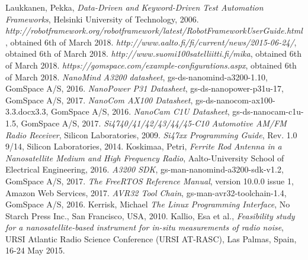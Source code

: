 \documentclass[english,12pt,a4paper,pdftex,elec,utf8]{aaltothesis}
\begin{document}
\begin{thebibliography}{99}
 Laukkanen, Pekka,
  \textit{Data-Driven and Keyword-Driven Test Automation Frameworks}, Helsinki University of Technology, 2006.
  \textit{http://robotframework.org/robotframework/latest/RobotFrameworkUserGuide.html}, obtained 6th of March 2018.  
  \textit{http://www.aalto.fi/fi/current/news/2015-06-24/}, obtained 6th of March 2018.
  \textit{http://www.suomi100satelliitti.fi/mika}, obtained 6th of March 2018.
  \textit{https://gomspace.com/example-configurations.aspx}, obtained 6th of March 2018.
  \textit{NanoMind A3200 datasheet}, gs-ds-nanomind-a3200-1.10, GomSpace A/S, 2016.
  \textit{NanoPower P31 Datasheet}, gs-ds-nanopower-p31u-17, GomSpace A/S, 2017.
  \textit{NanoCom AX100 Datasheet}, gs-ds-nanocom-ax100-3.3.docx3.3, GomSpace A/S, 2016.
  \textit{NanoCam C1U Datasheet}, gs-ds-nanocam-c1u-1.5, GomSpace A/S, 2017.
  \textit{Si4740/41/42/43/44/45-C10 Automotive AM/FM Radio
Receiver}, Silicon Laboratories, 2009.
  \textit{Si47xx Programming Guide}, Rev. 1.0 9/14, Silicon Laboratories, 2014.
 Koskimaa, Petri,
  \textit{Ferrite Rod Antenna in a Nanosatellite Medium and High Frequency Radio}, Aalto-University School of Electrical Engineering, 2016.
  \textit{A3200 SDK}, gs-man-nanomind-a3200-sdk-v1.2, GomSpace A/S, 2017.
  \textit{The FreeRTOS Reference Manual}, version 10.0.0 issue 1, Amazon Web Services, 2017.
  \textit{AVR32 Tool Chain}, gs-man-avr32-toolchain-1.4, GomSpace A/S, 2016.
 Kerrisk, Michael
  \textit{The Linux Programming Interface}, No Starch Press Inc., San Francisco, USA, 2010.
 Kallio, Esa et al.,
  \textit{Feasibility study for a nanosatellite-based instrument for in-situ measurements of radio noise},  URSI Atlantic Radio Science Conference (URSI AT-RASC), Las Palmas, Spain, 16-24 May 2015. 

\end{thebibliography}

\clearpage

\thesisappendix
\end{document}
